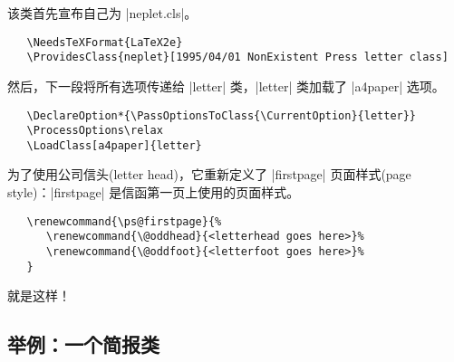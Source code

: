 \documentclass{ltxguide}[1995/11/28]
\newcommand{\heiti}{\CJKfamily{heiti}} %
\begin{document}
该类首先宣布自己为 |neplet.cls|。
\begin{verbatim}
   \NeedsTeXFormat{LaTeX2e}
   \ProvidesClass{neplet}[1995/04/01 NonExistent Press letter class]
\end{verbatim}
然后，下一段将所有选项传递给 |letter| 类，|letter| 类加载了 |a4paper| 选项。
\begin{verbatim}
   \DeclareOption*{\PassOptionsToClass{\CurrentOption}{letter}}
   \ProcessOptions\relax
   \LoadClass[a4paper]{letter}
\end{verbatim}
为了使用公司信头(letter head)，它重新定义了 |firstpage| 页面样式(page style)：|firstpage| 是信函第一页上使用的页面样式。
\begin{verbatim}
   \renewcommand{\ps@firstpage}{%
      \renewcommand{\@oddhead}{<letterhead goes here>}%
      \renewcommand{\@oddfoot}{<letterfoot goes here>}%
   }
\end{verbatim}
就是这样！

\subsection[举例：一个简报类]{\heiti 举例：一个简报类}
\end{document}
